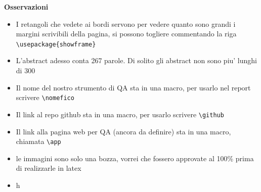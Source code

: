 \documentclass[11pt,hidelinks]{article}
\begin{document}
\begin{mdframed}[style=MyFrame,nobreak=true,align=center,userdefinedwidth=30em]
\textbf{Osservazioni}

\begin{itemize}
    \item I retangoli che vedete ai bordi servono per vedere quanto sono grandi i margini scrivibili della pagina, si possono togliere commentando la riga \texttt{\textbackslash usepackage\{showframe\}}
    \item L'abstract adesso conta 267 parole. Di solito gli abstract non sono piu' lunghi di 300
    \item Il nome del nostro strumento di QA sta in una macro, per usarlo nel report scrivere \texttt{\textbackslash nomefico}
    \item Il link al repo github sta in una macro, per usarlo scrivere \texttt{\textbackslash github}
    \item Il link alla pagina web per QA (ancora da definire) sta in una macro, chiamata \texttt{\textbackslash app}
    \item le immagini sono solo una bozza, vorrei che fossero approvate al 100\% prima di realizzarle in latex
    \item h
\end{itemize}
\end{mdframed}

\newpage
\end{document}
